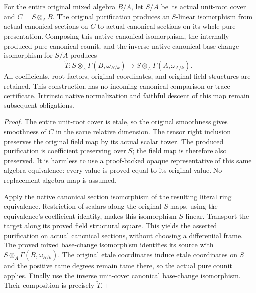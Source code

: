 \begin{lemma}
\label{lem:kn-global-trace-mixed-extended-counit}
\leanok
For the entire original mixed algebra $B/A$, let $S/A$ be its actual
unit-root cover and $C=S\otimes_A B$.  The original purification produces
an $S$-linear isomorphism from actual canonical sections on $C$ to actual
canonical sections on its whole pure presentation.  Composing this native
canonical isomorphism, the internally produced pure canonical counit, and
the inverse native canonical base-change isomorphism for $S/A$ produces
\[
 \widetilde T:S\otimes_A\Gamma(B,\omega_{B/k})
       \longrightarrow S\otimes_A\Gamma(A,\omega_{A/k}).
\]
All coefficients, root factors, original coordinates, and original field
structures are retained.  This construction has no incoming canonical
comparison or trace certificate.  Intrinsic native normalization and
faithful descent of this map remain subsequent obligations.
\end{lemma}
\begin{proof}
The entire unit-root cover is etale, so the original smoothness gives
smoothness of $C$ in the same relative dimension.  The tensor right
inclusion preserves the original field map by its actual scalar tower.
The produced purification is coefficient preserving over $S$; the field
map is therefore also preserved.  It is harmless to use a proof-backed
opaque representative of this same algebra equivalence: every value is
proved equal to its original value.  No replacement algebra map is
assumed.

Apply the native canonical section isomorphism of the resulting literal
ring equivalence.  Restriction of scalars along the original $S$ maps,
using the equivalence's coefficient identity, makes this isomorphism
$S$-linear.  Transport the target along its proved field structural
square.  This yields the asserted purification on actual canonical
sections, without choosing a differential frame.  The proved
mixed base-change isomorphism identifies its source with
$S\otimes_A\Gamma(B,\omega_{B/k})$.  The original etale coordinates induce
etale coordinates on $S$ and the positive tame degrees remain tame there,
so the actual pure counit applies.  Finally use the inverse unit-cover
canonical base-change isomorphism.  Their composition is precisely
$\widetilde T$.
\end{proof}

